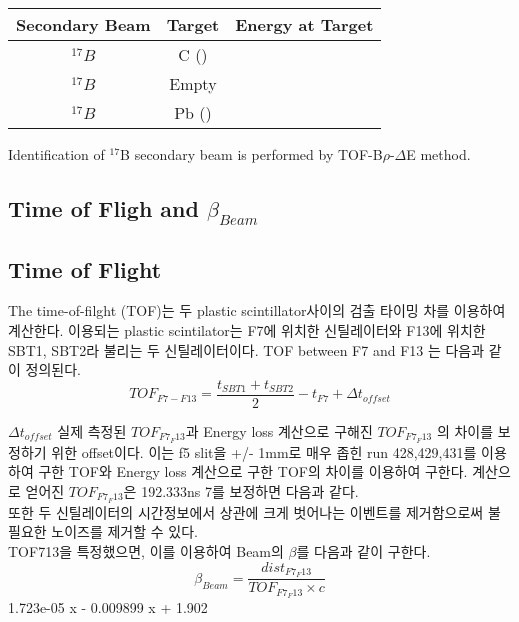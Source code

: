 \begin{center}
    \begin{tabular}[h]{c|c|c}
        \hline
        Secondary Beam & Target & Energy at Target \\
        \hline
        ${}^{17}B$ & C () & \\
        ${}^{17}B$ & Empty & \\
        ${}^{17}B$ & Pb () & \\
        \hline    
    \end{tabular}
\end{center}

Identification of ${}^{17}$B secondary beam  is performed by TOF-B$\rho$-$\Delta$E method. 
\subsection{Time of Fligh and $\beta_{Beam}$}
\subsection*{Time of Flight}
The time-of-filght (TOF)는 두 plastic scintillator사이의 검출 타이밍 차를 이용하여 계산한다. 이용되는 plastic scintilator는 F7에 위치한 신틸레이터와 F13에 위치한 SBT1, SBT2라 불리는 두 신틸레이터이다. TOF between F7 and F13 는 다음과 같이 정의된다.
\begin{displaymath}
    TOF_{F7-F13} = \frac{t_{SBT1} + t_{SBT2}}{2} - t_{F7} + \Delta t_{offset}
\end{displaymath}

$\Delta t_{offset}$ 실제 측정된 $TOF_{F7_F13}$과 Energy loss 계산으로 구해진 $TOF_{F7_F13}$ 의 차이를 보정하기 위한 offset이다. 이는 f5 slit을 +/- 1mm로 매우 좁힌 run 428,429,431를 이용하여 구한 TOF와 Energy loss 계산으로 구한 TOF의 차이를 이용하여 구한다. 계산으로 얻어진 $TOF_{F7_F13}$은 192.333ns 7를 보정하면 다음과 같다.\\
또한 두 신틸레이터의 시간정보에서 상관에 크게 벗어나는 이벤트를 제거함으로써 불필요한 노이즈를 제거할 수 있다. \\
\indent TOF713을 특정했으면, 이를 이용하여 Beam의 $\beta$를 다음과 같이 구한다.
\begin{displaymath}
    \beta_{Beam} = \frac{dist_{F7_F13}}{TOF_{F7_F13} \times c}
\end{displaymath}
1.723e-05 x - 0.009899 x + 1.902
